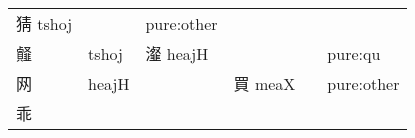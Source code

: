 \documentclass[14pt,a4paper]{scrartcl}
\begin{document}
\begin{longtable}[c]{@{}llllll@{}}
\begin{minipage}[t]{0.14\columnwidth}
猜 tshoj
\strut\end{minipage} &
\begin{minipage}[t]{0.14\columnwidth}\raggedright\strut
\strut\end{minipage} &
\begin{minipage}[t]{0.14\columnwidth}\raggedright\strut
pure:other
\strut\end{minipage}\tabularnewline
\begin{minipage}[t]{0.14\columnwidth}\raggedright\strut
䪥
\strut\end{minipage} &
\begin{minipage}[t]{0.14\columnwidth}\raggedright\strut
tshoj
\strut\end{minipage} &
\begin{minipage}[t]{0.14\columnwidth}\raggedright\strut
瀣 heajH
\strut\end{minipage} &
\begin{minipage}[t]{0.14\columnwidth}\raggedright\strut
\strut\end{minipage} &
\begin{minipage}[t]{0.14\columnwidth}\raggedright\strut
\strut\end{minipage} &
\begin{minipage}[t]{0.14\columnwidth}\raggedright\strut
pure:qu
\strut\end{minipage}\tabularnewline
\begin{minipage}[t]{0.14\columnwidth}\raggedright\strut
网
\strut\end{minipage} &
\begin{minipage}[t]{0.14\columnwidth}\raggedright\strut
heajH
\strut\end{minipage} &
\begin{minipage}[t]{0.14\columnwidth}\raggedright\strut
\strut\end{minipage} &
\begin{minipage}[t]{0.14\columnwidth}\raggedright\strut
買 meaX
\strut\end{minipage} &
\begin{minipage}[t]{0.14\columnwidth}\raggedright\strut
\strut\end{minipage} &
\begin{minipage}[t]{0.14\columnwidth}\raggedright\strut
pure:other
\strut\end{minipage}\tabularnewline
\begin{minipage}[t]{0.14\columnwidth}\raggedright\strut
乖
\strut\end{minipage} &
\begin{minipage}[t]{0.14\columnwidth}\raggedright\strut

\end{minipage}
\end{longtable}
\end{document}
